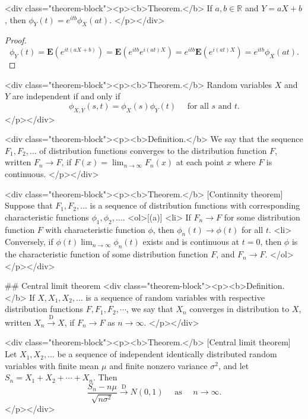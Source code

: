 <div class="theorem-block"><p><b>Theorem.</b> 
If $a, b \in \mathbb{R}$ and $Y = aX+b$, then $\phi_{Y}(t)=e^{i t b} \phi_{X}(a t)$.
</p></div>
\begin{proof}
$$\begin{equation}
    \phi_{Y}(t)=\mathbf{E}\left(e^{i t(a X+b)}\right)=\mathbf{E}\left(e^{i t b} e^{i(a t) X}\right) = e^{i t b} \mathbf{E}\left(e^{i(a t) X}\right)=e^{i t b} \phi_{X}(a t).
\end{equation}$$
\end{proof}

<div class="theorem-block"><p><b>Theorem.</b> 
Random variables $X$ and $Y$ are independent if and only if
$$\begin{equation}
    \phi_{X, Y}(s, t)=\phi_{X}(s) \phi_{Y}(t) \quad \text { for all } s \text { and } t.
\end{equation}$$
</p></div>

<div class="theorem-block"><p><b>Definition.</b> 
We say that the sequence $F_1 , F_2, \dots $ of distribution functions converges to the distribution function $F$, written $F_n \to F$, if $F(x) = \lim_{n\to\infty} F_n(x)$ at each point $x$ where $F$ is continuous.
</p></div>

<div class="theorem-block"><p><b>Theorem.</b> [Continnity theorem]
Suppose that $F_1 , F_2, \dots $ is a sequence of distribution functions 
with corresponding characteristic functions $\phi_1 , \phi_2, \dots $.
<ol>[(a)]
    <li> If $F_n \to F$ for some distribution function $F$ with characteristic function $\phi$, then $\phi_n(t) \to \phi(t)$ for all $t$.
    <li> Conversely, if $\phi(t) \lim_{n\to\infty} \phi_n(t)$ exists and is continuous at $t=0$, then $\phi$ is the characteristic function of some distribution function $F$, and $F_n \to F$.
</ol>
</p></div>


## Central limit theorem
<div class="theorem-block"><p><b>Definition.</b> 
If $X, X_1 , X_2 , \dots$ is a sequence of random variables with respective distribution functions $F, F_1, F_2, \cdots$, we say that $X_n$ converges in distribution to $X$, written $X_{n} \stackrel{\mathrm{D}}{\rightarrow} X$, if $F_n \to F$ as $n \to\infty$.
</p></div>

<div class="theorem-block"><p><b>Theorem.</b> [Central limit theorem]
Let $X_1 , X_2, \dots$ be a sequence of independent identically distributed random variables with finite mean $\mu$ and finite nonzero variance $\sigma^2$, and let $S_n = X_1 + X_2 + \cdots + X_n$. Then
$$\begin{equation}
    \frac{S_{n}-n \mu}{\sqrt{n \sigma^{2}}} \stackrel{\mathrm{D}}{\rightarrow} N(0,1) \quad \text { as } \quad n \rightarrow \infty.
\end{equation}$$
</p></div>

